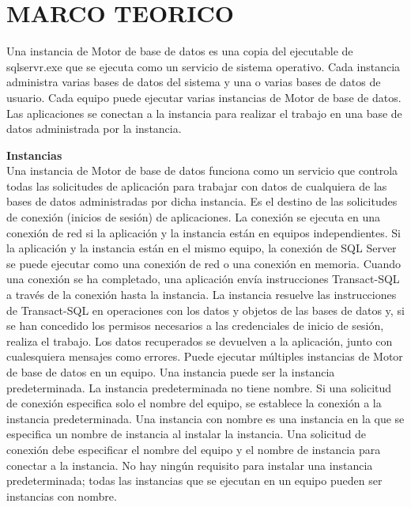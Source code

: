 \section{MARCO TEORICO} 

Una instancia de Motor de base de datos es una copia del ejecutable de sqlservr.exe que se ejecuta como un servicio de sistema operativo. Cada instancia administra varias bases de datos del sistema y una o varias bases de datos de usuario. Cada equipo puede ejecutar varias instancias de Motor de base de datos. Las aplicaciones se conectan a la instancia para realizar el trabajo en una base de datos administrada por la instancia.

\textbf{Instancias}\\

Una instancia de Motor de base de datos funciona como un servicio que controla todas las solicitudes de aplicación para trabajar con datos de cualquiera de las bases de datos administradas por dicha instancia. Es el destino de las solicitudes de conexión (inicios de sesión) de aplicaciones. La conexión se ejecuta en una conexión de red si la aplicación y la instancia están en equipos independientes. Si la aplicación y la instancia están en el mismo equipo, la conexión de SQL Server se puede ejecutar como una conexión de red o una conexión en memoria. Cuando una conexión se ha completado, una aplicación envía instrucciones Transact-SQL a través de la conexión hasta la instancia. La instancia resuelve las instrucciones de Transact-SQL en operaciones con los datos y objetos de las bases de datos y, si se han concedido los permisos necesarios a las credenciales de inicio de sesión, realiza el trabajo. Los datos recuperados se devuelven a la aplicación, junto con cualesquiera mensajes como errores.
Puede ejecutar múltiples instancias de Motor de base de datos en un equipo. Una instancia puede ser la instancia predeterminada. La instancia predeterminada no tiene nombre. Si una solicitud de conexión especifica solo el nombre del equipo, se establece la conexión a la instancia predeterminada. Una instancia con nombre es una instancia en la que se especifica un nombre de instancia al instalar la instancia. Una solicitud de conexión debe especificar el nombre del equipo y el nombre de instancia para conectar a la instancia. No hay ningún requisito para instalar una instancia predeterminada; todas las instancias que se ejecutan en un equipo pueden ser instancias con nombre.

